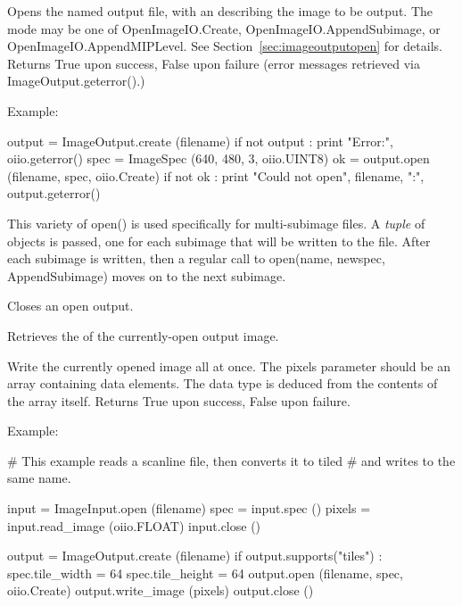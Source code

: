 Opens the named output file, with an \ImageSpec describing the image to
be output.  The {\cf mode} may be one of {\cf OpenImageIO.Create},
{\cf OpenImageIO.AppendSubimage}, or {\cf OpenImageIO.AppendMIPLevel}.
See Section~\ref{sec:imageoutputopen} for details.  Returns {\cf True}
upon success, {\cf False} upon failure (error messages retrieved via
{\cf ImageOutput.geterror()}.)

\noindent Example:
\begin{code}
    output = ImageOutput.create (filename)
    if not output :
        print "Error:", oiio.geterror()
    spec = ImageSpec (640, 480, 3, oiio.UINT8)
    ok = output.open (filename, spec, oiio.Create)
    if not ok :
        print "Could not open", filename, ":", output.geterror()
\end{code}
\apiend

This variety of {\cf open()} is used specifically for multi-subimage files.
A \emph{tuple} of \ImageSpec objects is passed, one for each subimage
that will be written to the file.  After each subimage is written, then
a regular call to {\cf open(name, newspec, {\ce AppendSubimage})} moves
on to the next subimage.
\apiend

Closes an open output.
\apiend

Retrieves the \ImageSpec of the currently-open output image.
\apiend

Write the currently opened image all at once.  The {\cf pixels} parameter
should be an {\cf array} containing data elements. The data type is
deduced from the contents of the array itself.
Returns {\cf True} upon success, {\cf False} upon failure.

\noindent Example:
\begin{code}
    # This example reads a scanline file, then converts it to tiled
    # and writes to the same name.

    input = ImageInput.open (filename)
    spec = input.spec ()
    pixels = input.read_image (oiio.FLOAT)
    input.close ()

    output = ImageOutput.create (filename)
    if output.supports("tiles") :
        spec.tile_width = 64
        spec.tile_height = 64
        output.open (filename, spec, oiio.Create)
        output.write_image (pixels)
        output.close ()
\end{code}
\apiend

